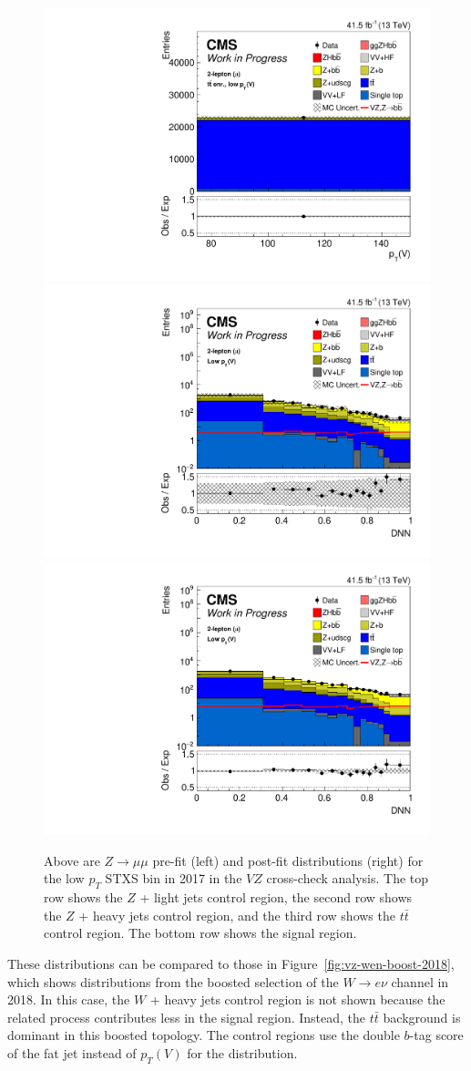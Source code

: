 \begin{figure}
  \includegraphics[width=0.35\linewidth]{figures/210414_STXS_VZ_unblinded_XbbVZ_e4179c95_postfitplots/plot_shapes_vhbb_Zmm_4_13TeV2017_postfit} \\
  \includegraphics[width=0.35\linewidth]{figures/210414_STXS_VZ_unblinded_XbbVZ_e4179c95_postfitplots/plot_shapes_vhbb_Zmm_1_13TeV2017_prefit_logy}
  \includegraphics[width=0.35\linewidth]{figures/210414_STXS_VZ_unblinded_XbbVZ_e4179c95_postfitplots/plot_shapes_vhbb_Zmm_1_13TeV2017_postfit_logy} \\
  \caption[$Z\rightarrow \mu\mu$ $V\!Z$ distributions for low $p_T$ in 2017]{
    Above are $Z\rightarrow \mu\mu$ pre-fit (left) and post-fit distributions (right)
    for the low $p_T$ STXS bin in 2017 in the $V\!Z$ cross-check analysis.
    The top row shows the $Z$ + light jets control region,
    the second row shows the $Z$ + heavy jets control region,
    and the third row shows the $t\bar{t}$ control region.
    The bottom row shows the signal region.
  }
  \label{fig:vz-zmm-low-2017}
\end{figure}
%
These distributions can be compared to those in Figure~\ref{fig:vz-wen-boost-2018},
which shows distributions from the boosted selection of the $W\rightarrow e\nu$ channel in 2018.
In this case, the $W$ + heavy jets control region is not shown because the related process contributes less
in the signal region.
Instead, the $t\bar{t}$ background is dominant in this boosted topology.
The control regions use the double $b$-tag score of the fat jet instead of $p_T(V)$ for the distribution.

